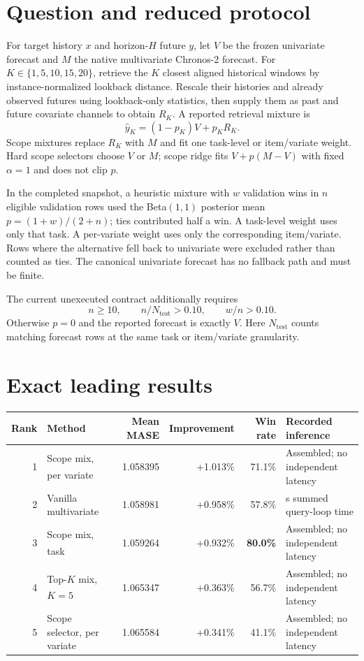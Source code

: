 \documentclass[10pt,a4paper]{article}
\newcommand{\good}[1]{\textcolor{green!45!black}{#1}}
\newcommand{\snapshot}{\textsuperscript{\dag}}
\begin{document}
\section{Question and reduced protocol}

For target history $x$ and horizon-$H$ future $y$, let $V$ be the frozen
univariate forecast and $M$ the native multivariate Chronos-2 forecast. For
$K\in\{1,5,10,15,20\}$, retrieve the $K$ closest aligned historical windows by
instance-normalized lookback distance. Rescale their histories and already
observed futures using lookback-only statistics, then supply them as past and
future covariate channels to obtain $R_K$. A reported retrieval mixture is
\[
  \widehat y_K=(1-p_K)V+p_KR_K.
\]
Scope mixtures replace $R_K$ with $M$ and fit one task-level or item/variate
weight. Hard scope selectors choose $V$ or $M$; scope ridge fits
$V+p(M-V)$ with fixed $\alpha=1$ and does not clip $p$.

In the completed snapshot, a heuristic mixture with $w$ validation wins in
$n$ eligible validation rows used the Beta$(1,1)$ posterior mean
$p=(1+w)/(2+n)$; ties contributed half a win. A task-level weight uses only
that task. A per-variate weight uses only the corresponding item/variate.
Rows where the alternative fell back to univariate were excluded rather than
counted as ties. The canonical univariate forecast has no fallback path and
must be finite.

The current unexecuted contract additionally requires
\[
 n\ge 10,\qquad n/N_{\mathrm{test}}>0.10,\qquad w/n>0.10.
\]
Otherwise $p=0$ and the reported forecast is exactly $V$. Here
$N_{\mathrm{test}}$ counts matching forecast rows at the same task or
item/variate granularity.

\section{Exact leading results}

\begin{center}
\small
\begin{tabularx}{\textwidth}{@{}rXrrr>{\raggedright\arraybackslash}p{45mm}@{}}
\toprule
Rank & Method & Mean MASE & Improvement & Win rate & Recorded inference\\
\midrule
1 & Scope mix, per variate\snapshot & 1.058395 & \good{+1.013\%} & 71.1\% & Assembled; no independent latency\\
2 & Vanilla multivariate & 1.058981 & \good{+0.958\%} & 57.8\% & 87.1 s summed query-loop time\\
3 & Scope mix, task\snapshot & 1.059264 & \good{+0.932\%} & \textbf{80.0\%} & Assembled; no independent latency\\
4 & Top-$K$ mix, $K=5$\snapshot & 1.065347 & \good{+0.363\%} & 56.7\% & Assembled; no independent latency\\
5 & Scope selector, per variate & 1.065584 & \good{+0.341\%} & 41.1\% & Assembled; no independent latency\\
\bottomrule
\end{tabularx}
\end{center}
\end{document}
